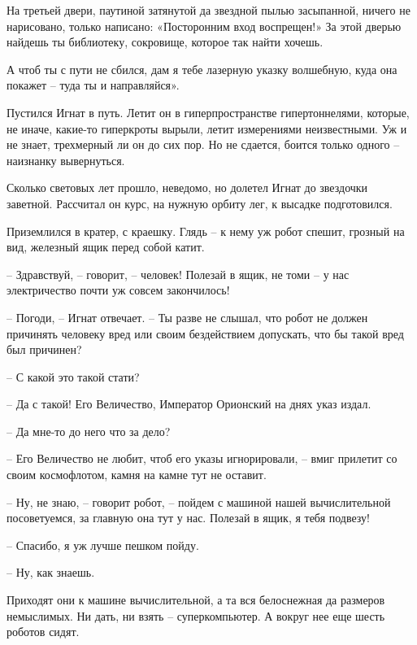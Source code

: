 \documentclass[ebook,oneside,final,openright]{memoir}
\begin{document}
\par
На третьей двери, паутиной затянутой да звездной пылью засыпанной, ничего не нарисовано, только написано: «Посторонним вход воспрещен!» За этой дверью найдешь ты библиотеку, сокровище, которое так найти хочешь.\par
\par
А чтоб ты с пути не сбился, дам я тебе лазерную указку волшебную, куда она покажет – туда ты и направляйся».\par
\par
Пустился Игнат в путь. Летит он в гиперпространстве гипертоннелями, которые, не иначе, какие-то гиперкроты вырыли, летит измерениями неизвестными. Уж и не знает, трехмерный ли он до сих пор. Но не сдается, боится только одного – наизнанку вывернуться.\par
\par
Сколько световых лет прошло, неведомо, но долетел Игнат до звездочки заветной. Рассчитал он курс, на нужную орбиту лег, к высадке подготовился.\par
\par
Приземлился в кратер, с краешку. Глядь – к нему уж робот спешит, грозный на вид, железный ящик перед собой катит.\par
– Здравствуй, – говорит, – человек! Полезай в ящик, не томи – у нас электричество почти уж совсем закончилось!\par
– Погоди, – Игнат отвечает. – Ты разве не слышал, что робот не должен причинять человеку вред или своим бездействием допускать, что бы такой вред был причинен?\par
– С какой это такой стати?\par
– Да с такой! Его Величество, Император Орионский на днях указ издал.\par
– Да мне-то до него что за дело?\par
– Его Величество не любит, чтоб его указы игнорировали, – вмиг прилетит со своим космофлотом, камня на камне тут не оставит.\par
– Ну, не знаю, – говорит робот, – пойдем с машиной нашей вычислительной посоветуемся, за главную она тут у нас. Полезай в ящик, я тебя подвезу!\par
– Спасибо, я уж лучше пешком пойду. \par
– Ну, как знаешь. \par
\par
Приходят они к машине вычислительной, а та вся белоснежная да размеров немыслимых. Ни дать, ни взять – суперкомпьютер. А вокруг нее еще шесть роботов сидят. \par
\end{document}
